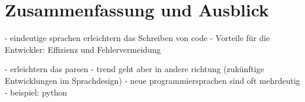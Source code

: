 \documentclass[runningheads]{llncs}
\begin{document}
\section{Zusammenfassung und Ausblick}
- eindeutige sprachen erleichtern das Schreiben von code
- Vorteile für die Entwickler: Effizienz und Fehlervermeidung

- erleichtern das parsen
- trend geht aber in andere richtung (zukünftige Entwicklungen im Sprachdesign)
- neue programmiersprachen sind oft mehrdeutig
- beispiel: python

%
%
%


\end{document}
